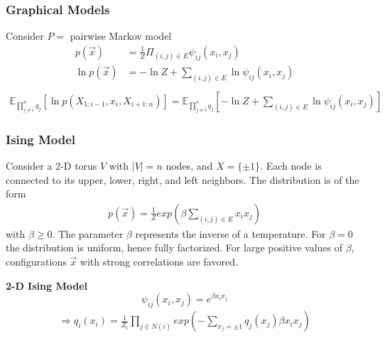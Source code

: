 \documentclass[11pt,a4paper]{article}
\begin{document}
\subsubsection{Graphical Models}
Consider $P=$ pairwise Markov model
\begin{equation}
    \begin{aligned}
        p(\vec{x})&=\frac{1}{Z}\Pi_{(i,j)\in E}\psi_{ij}(x_i,x_j)\\
        \ln p(\vec{x})&=-\ln{Z}+\sum_{(i,j)\in E}\ln\psi_{ij}(x_i,x_j)\\
    \end{aligned}
    \nonumber
\end{equation}
\begin{equation}
    \begin{aligned}
        {\mathbb{E}_{\prod_{j\neq i}^nq_j}[\ln p(X_{1:i-1},x_i,X_{i+1:n})]}=\mathbb{E}_{\prod_{j\neq i}^nq_j}[-\ln{Z}+\sum_{(i,j)\in E}\ln\psi_{ij}(x_i,x_j)]
    \end{aligned}
    \nonumber
\end{equation}

\subsubsection{Ising Model}
Consider a 2-D torus $V$ with $|V| = n$ nodes, and $X = \{\pm 1\}$. Each node is connected to its upper, lower, right, and left neighbors. The distribution is of the form
\begin{equation}
    \begin{aligned}
        p(\vec{x})=\frac{1}{Z}exp\left(\beta\sum_{(i,j)\in E}x_ix_j\right)
    \end{aligned}
    \nonumber
\end{equation}
with $\beta \geq 0$. The parameter $\beta$ represents the inverse of a temperature. For $\beta = 0$ the distribution is uniform, hence fully factorized. For large positive values of $\beta$, configurations $\vec{x}$ with strong correlations are favored.

\textbf{2-D Ising Model}
$$\psi_{ij}(x_i,x_j)=e^{\beta x_ix_j}$$
\begin{equation}
    \begin{aligned}
        \Rightarrow q_i(x_i)=\frac{1}{Z_i}\prod_{j\in N(i)}exp\left(-\sum_{x_j=\pm 1}q_j(x_j)\beta x_i x_j\right)
    \end{aligned}
    \nonumber
\end{equation}
\end{document}
